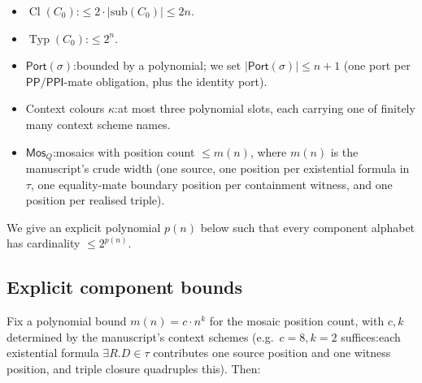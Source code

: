 \documentclass[11pt]{article}
\newcommand{\Cl}{\operatorname{Cl}}
\newcommand{\Typ}{\operatorname{Typ}}
\newcommand{\PP}{\mathsf{PP}}
\newcommand{\PPI}{\mathsf{PPI}}
\newcommand{\Port}{\mathsf{Port}}
\newcommand{\Mos}{\mathsf{Mos}}
\begin{document}
\begin{itemize}[leftmargin=2em]
  \item \(\Cl(C_0)\):\@ \(\le 2 \cdot |\mathrm{sub}(C_0)| \le 2n\).
  \item \(\Typ(C_0)\):\@ \(\le 2^n\).
  \item \(\Port(\sigma)\):\@ bounded by a polynomial; we set
    \(|\Port(\sigma)| \le n+1\) (one port per \(\PP/\PPI\)-mate
    obligation, plus the identity port).
  \item Context colours \(\kappa\):\@ at most three polynomial slots,
    each carrying one of finitely many context scheme names.
  \item \(\Mos_Q\):\@ mosaics with position count \(\le m(n)\), where
    \(m(n)\) is the manuscript's crude width
    (one source, one position per existential formula in \(\tau\),
    one equality-mate boundary position per containment witness, and
    one position per realised triple).
\end{itemize}

We give an explicit polynomial \(p(n)\) below such that every
component alphabet has cardinality \(\le 2^{p(n)}\).

\subsection{Explicit component bounds}

Fix a polynomial bound \(m(n) = c \cdot n^k\) for the mosaic position
count, with \(c, k\) determined by the manuscript's context schemes
(e.g.\ \(c = 8, k = 2\) suffices:\@ each existential formula
\(\exists R.D \in \tau\) contributes one source position and one
witness position, and triple closure quadruples this).  Then:
\end{document}
